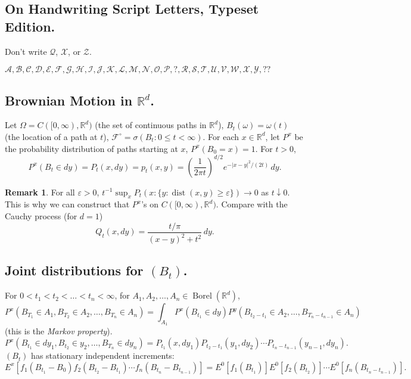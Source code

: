 \documentclass{article}
\DeclareMathOperator{\Borel}{Borel}
\newcommand{\R}{\mathbb{R}}
\newcommand{\F}{\mathscr{F}}
\theoremstyle{definition}
\newtheorem*{remark}{Remark}
\begin{document}
\subsection*{On Handwriting Script Letters, Typeset Edition.}
Don't write $\mathscr{Q}$, $\mathscr{X}$, or $\mathscr{Z}$.

$\mathscr{A}, \mathscr{B}, \mathscr{C}, \mathscr{D}, \mathscr{E}, \mathscr{F}, \mathscr{G}, \mathscr{H}, \mathscr{I}, \mathscr{J}, \mathscr{K}, \mathscr{L}, \mathscr{M}, \mathscr{N}, \mathscr{O}, \mathscr{P}, ?, \mathscr{R}, \mathscr{S}, \mathscr{T}, \mathscr{U}, \mathscr{V}, \mathscr{W}, \mathscr{X}, \mathscr{Y}, ??$

\subsection*{Brownian Motion in $\R^d$.}
Let $\Omega = C([0,\infty), \R^d)$ (the set of continuous paths in $\R^d$), $B_t(\omega) = \omega(t)$ (the location of a path at $t$), $\F^\circ = \sigma(B_t : 0 \leq t < \infty)$. For each $x \in \R^d$, let $P^x$ be the probability distribution of paths starting at $x$, $P^x(B_0 = x) = 1$. For $t > 0$,
\[
    P^x(B_t \in dy) = P_t(x, dy) = p_t(x,y) = \left(\frac{1}{2\pi t}\right)^{d/2} e^{-|x-y|^2/(2t)} \,dy.
\]
\begin{remark}
For all $\varepsilon > 0$, $t^{-1} \sup_x P_t(x : \{y : \operatorname{dist}(x,y) \geq\varepsilon\}) \to 0$ as $t \downarrow 0$. This is why we can construct that $P^x$'s on $C([0, \infty), \R^d)$. Compare with the Cauchy process (for $d = 1$)
\[
    Q_t(x,dy) = \frac{t/\pi}{(x-y)^2 + t^2}\,dy.
\]
\end{remark}

\subsection*{Joint distributions for $(B_t)$.}
For $0 < t_1 < t_2 < \dots < t_n < \infty$, for $A_1, A_2, \dots, A_n \in \Borel(\R^d)$,
\[
    P^x(B_{T_1} \in A_1, B_{T_2} \in A_2, \dots, B_{T_n} \in A_n) = \int_{A_1} P^x(B_{t_1} \in dy)P^y(B_{t_2 - t_1} \in A_2, \dots, B_{T_n - t_{n-1}} \in A_n)
\]
(this is the \emph{Markov property}).
\[
    P^x(B_{t_1} \in dy_1, B_{t_2} \in y_2, \dots, B_{T_n} \in dy_n) = P_{t_1}(x, dy_1)P_{t_2 - t_1}(y_1, dy_2) \cdots P_{t_n - t_{n-1}}(y_{n-1}, dy_n).
\]
$(B_t)$ has stationary independent increments:
\[
    E^x[f_1(B_{t_1} - B_0)f_2(B_{t_2} - B_{t_1}) \cdots f_n(B_{t_n} - B_{t_{n-1}})] = E^0[f_1(B_{t_1})]E^0[f_2(B_{t_2})] \cdots E^0[f_n(B_{t_n - t_{n-1}})].
\]
\end{document}
